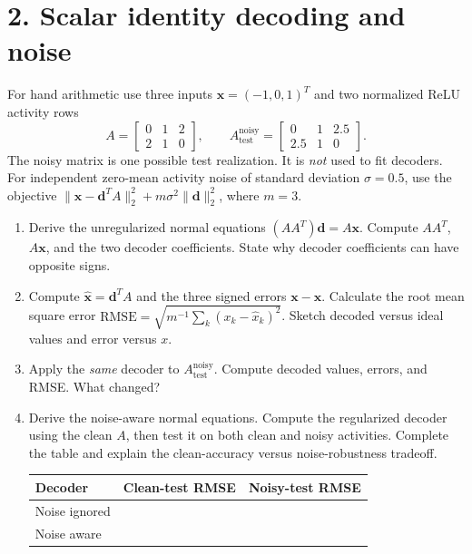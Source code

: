 \documentclass[11pt,letterpaper]{article}
\newcommand{\vct}[1]{\boldsymbol{#1}}
\begin{document}
\section*{2. Scalar identity decoding and noise}
For hand arithmetic use three inputs \(\vct{x}=(-1,0,1)^T\) and two normalized ReLU activity rows
\[
A=\begin{bmatrix}0&1&2\\2&1&0\end{bmatrix},\qquad
A_{\mathrm{test}}^{\mathrm{noisy}}=\begin{bmatrix}0&1&2.5\\2.5&1&0\end{bmatrix}.
\]
The noisy matrix is one possible test realization. It is \emph{not} used to fit decoders. For independent zero-mean activity noise of standard deviation \(\sigma=0.5\), use the objective \(\|\vct{x}-\vct{d}^{T}A\|_2^2+m\sigma^2\|\vct{d}\|_2^2\), where \(m=3\).
\begin{enumerate}[label=\textbf{2\alph*.}]
\item Derive the unregularized normal equations \((AA^T)\vct{d}=A\vct{x}\). Compute \(AA^T\), \(A\vct{x}\), and the two decoder coefficients. State why decoder coefficients can have opposite signs.
\item Compute \(\hat{\vct{x}}=\vct{d}^{T}A\) and the three signed errors \(\vct{x}-\hat{\vct{x}}\). Calculate the root mean square error
\(\mathrm{RMSE}=\sqrt{m^{-1}\sum_k(x_k-\hat{x}_k)^2}\). Sketch decoded versus ideal values and error versus \(x\).
\item Apply the \emph{same} decoder to \(A_{\mathrm{test}}^{\mathrm{noisy}}\). Compute decoded values, errors, and RMSE. What changed?
\item Derive the noise-aware normal equations. Compute the regularized decoder using the clean \(A\), then test it on both clean and noisy activities. Complete the table and explain the clean-accuracy versus noise-robustness tradeoff.
\begin{center}\begin{tabular}{lcc}\toprule
Decoder & Clean-test RMSE & Noisy-test RMSE\\\midrule
Noise ignored & & \\
Noise aware & & \\
\bottomrule\end{tabular}\end{center}
\end{enumerate}
\end{document}
